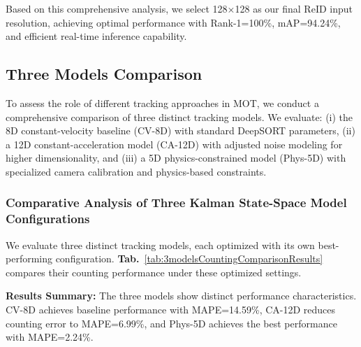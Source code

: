Based on this comprehensive analysis, we select 128×128 as our final ReID input resolution, achieving optimal performance with Rank-1=100\%, mAP=94.24\%, and efficient real-time inference capability.

\subsection{Three Models Comparison}

To assess the role of different tracking approaches in MOT, we conduct a comprehensive comparison of three distinct tracking models. We evaluate: (i) the 8D constant-velocity baseline (CV-8D) with standard DeepSORT parameters, (ii) a 12D constant-acceleration model (CA-12D) with adjusted noise modeling for higher dimensionality, and (iii) a 5D physics-constrained model (Phys-5D) with specialized camera calibration and physics-based constraints.

\subsubsection{Comparative Analysis of Three Kalman State-Space Model Configurations}

We evaluate three distinct tracking models, each optimized with its own best-performing configuration. \textbf{Tab.}~\ref{tab:3modelsCountingComparisonResults} compares their counting performance under these optimized settings.

\begin{table}[h]
    \centering
    \caption{Counting Performance Comparison of the Three Models}
    \label{tab:3modelsCountingComparisonResults}
\end{table}

\textbf{Results Summary:} The three models show distinct performance characteristics. CV-8D achieves baseline performance with MAPE=14.59\%, CA-12D reduces counting error to MAPE=6.99\%, and Phys-5D achieves the best performance with MAPE=2.24\%.

